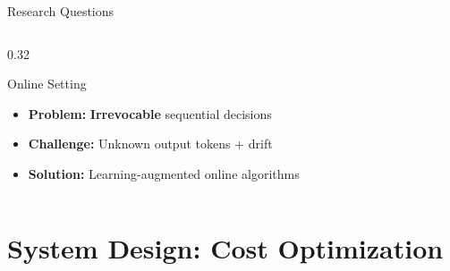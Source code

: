 \documentclass[aspectratio=169,10pt]{beamer}
\begin{document}
\begin{frame}{Research Questions}
\begin{columns}[T]
\begin{column}{0.32\textwidth}
\begin{exampleblock}{Online Setting}
\begin{itemize}\setlength{\itemsep}{1pt}
    \item \textbf{Problem:} \textbf{Irrevocable} sequential decisions
    \item \textbf{Challenge:} Unknown output tokens + drift
    \item \textbf{Solution:} Learning-augmented online algorithms
\end{itemize}
\end{exampleblock}
\end{column}
\end{columns}
\end{frame}

\section{System Design: Cost Optimization}
\end{document}
